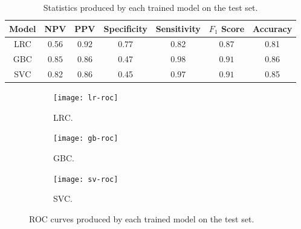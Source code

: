 \documentclass[twoside,11pt]{article}
\begin{document}
\begin{table}[!htb]
    \caption{Statistics produced by each trained model on the test set.}
    \centering
    \begin{tabular}{|c|c|c|c|c|c|c|}
        \hline
        \textbf{Model} & \textbf{NPV} & \textbf{PPV} & \textbf{Specificity} & \textbf{Sensitivity} & \textbf{$F_1$ Score} & \textbf{Accuracy} \\
        \hline
        LRC & 0.56 & $\mathbf{0.92}$ & $\mathbf{0.77}$ & 0.82 & 0.87 & 0.81 \\
        GBC & $\mathbf{0.85}$ & 0.86 & 0.47 & $\mathbf{0.98}$ & $\mathbf{0.91}$ & $\mathbf{0.86}$ \\
        SVC & 0.82 & 0.86 & 0.45 & 0.97 & $\mathbf{0.91}$ & 0.85 \\
        \hline
    \end{tabular}
    \label{tab:stats}
\end{table}

\begin{figure}[h]
    \centering
    \begin{subfigure}[b]{0.3\textwidth}
        \centering
        \texttt{[image: lr-roc]}
        \caption{LRC.}
        \label{fig:lr-roc}
    \end{subfigure}
    \hfill
    \begin{subfigure}[b]{0.3\textwidth}
        \centering
        \texttt{[image: gb-roc]}
        \caption{GBC.}
        \label{fig:gb-roc}
    \end{subfigure}
    \hfill
    \begin{subfigure}[b]{0.3\textwidth}
        \centering
        \texttt{[image: sv-roc]}
        \caption{SVC.}
        \label{fig:sv-roc}
    \end{subfigure}
       \caption{ROC curves produced by each trained model on the test set.}
       \label{fig:roc}
\end{figure}

\end{document}
